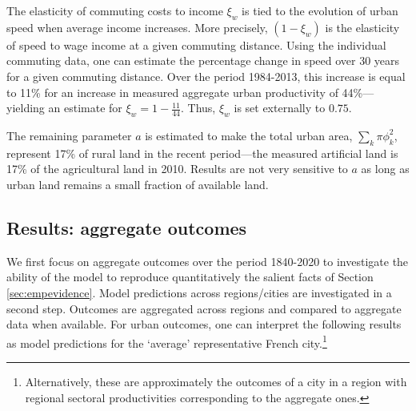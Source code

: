 \documentclass[./20250130-paper.tex]{subfiles}
\begin{document}
The elasticity of commuting costs to income $\xi_w$ is tied to the evolution of urban speed when average income increases. More precisely, $\left( 1-\xi_w\right)$ is the elasticity of speed to wage income at a given commuting distance. Using the individual commuting data, one can estimate the percentage change in speed over 30 years for a given commuting distance. Over the period 1984-2013, this increase is equal to 11\% for an increase in measured aggregate urban productivity of 44\%---yielding an estimate for $\xi_w = 1-\frac{11}{44}$. Thus, $\xi_w$ is set externally to $0.75$. 


The remaining parameter $a$ is estimated to make the total urban area, $\sum_k\pi\phi_k^2 $, represent 17\% of rural land in the recent period---the measured artificial land is 17\% of the agricultural land in 2010. Results are not very sensitive to $a$ as long as urban land remains a small fraction of available land.


\subsection{Results: aggregate outcomes}\label{sec:resagg}




We first focus on aggregate outcomes over the period 1840-2020 to investigate the ability of the model to reproduce quantitatively the salient facts of Section \ref{sec:empevidence}. Model predictions across regions/cities are investigated in a second step. Outcomes are aggregated across regions and compared to aggregate data when available. For urban outcomes, one can interpret the following results as model predictions for the `average' representative French city.\footnote{Alternatively, these are approximately the outcomes of a city in a region with regional sectoral productivities corresponding to the aggregate ones.}
\end{document}
